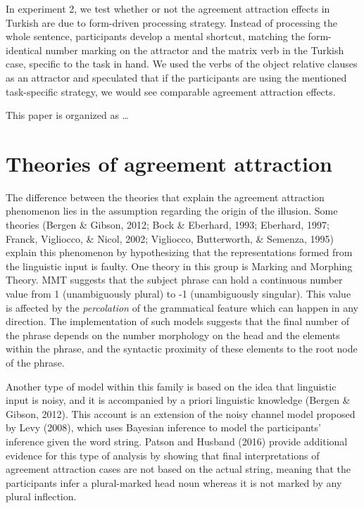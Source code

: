 \documentclass[
  english,
  doc,floatsintext]{apa6}
\begin{document}
In experiment 2, we test whether or not the agreement attraction effects in Turkish are due to form-driven processing strategy. Instead of processing the whole sentence, participants develop a mental shortcut, matching the form-identical number marking on the attractor and the matrix verb in the Turkish case, specific to the task in hand. We used the verbs of the object relative clauses as an attractor and speculated that if the participants are using the mentioned task-specific strategy, we would see comparable agreement attraction effects.

This paper is organized as \ldots 

\hypertarget{theories-of-agreement-attraction}{%
\section{Theories of agreement attraction}\label{theories-of-agreement-attraction}}

The difference between the theories that explain the agreement attraction phenomenon lies in the assumption regarding the origin of the illusion. Some theories (Bergen \& Gibson, 2012; Bock \& Eberhard, 1993; Eberhard, 1997; Franck, Vigliocco, \& Nicol, 2002; Vigliocco, Butterworth, \& Semenza, 1995) explain this phenomenon by hypothesizing that the representations formed from the linguistic input is faulty. One theory in this group is Marking and Morphing Theory. MMT suggests that the subject phrase can hold a continuous number value from 1 (unambiguously plural) to -1 (unambiguously singular). This value is affected by the \emph{percolation} of the grammatical feature which can happen in any direction. The implementation of such models suggests that the final number of the phrase depends on the number morphology on the head and the elements within the phrase, and the syntactic proximity of these elements to the root node of the phrase.

Another type of model within this family is based on the idea that linguistic input is noisy, and it is accompanied by a priori linguistic knowledge (Bergen \& Gibson, 2012). This account is an extension of the noisy channel model proposed by Levy (2008), which uses Bayesian inference to model the participants' inference given the word string. Patson and Husband (2016) provide additional evidence for this type of analysis by showing that final interpretations of agreement attraction cases are not based on the actual string, meaning that the participants infer a plural-marked head noun whereas it is not marked by any plural inflection.
\end{document}
